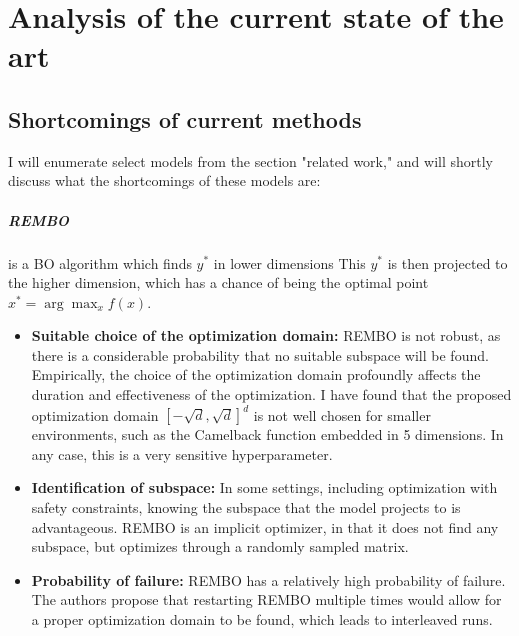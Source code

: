 \chapter{Analysis of the current state of the art}

\ifpdf
    \graphicspath{{Chapter3/Figs/Raster/}{Chapter3/Figs/PDF/}{Chapter3/Figs/}}
\else
    \graphicspath{{Chapter3/Figs/Vector/}{Chapter3/Figs/}}
\fi

\section{Shortcomings of current methods}
I will enumerate select models from the section "related work," and will shortly discuss what the shortcomings of these models are:

\paragraph{REMBO} is a BO algorithm which finds $y^*$ in lower dimensions This $y^*$ is then projected to the higher dimension, which has a chance of being the optimal point $x^* = \arg \max_{x} f(x)$. 

\begin{itemize}

\item \textbf{Suitable choice of the optimization domain:} REMBO is not robust, as there is a considerable probability that no suitable subspace will be found. 
Empirically, the choice of the optimization domain profoundly affects the duration and effectiveness of the optimization.
I have found that the proposed optimization domain $ \left[ -\sqrt{d}, \sqrt{d}  \right]^d $ is not well chosen for smaller environments, such as the Camelback function embedded in 5 dimensions.
In any case, this is a very sensitive hyperparameter.

\item \textbf{Identification of subspace:} In some settings, including optimization with safety constraints, knowing the subspace that the model projects to is advantageous. 
REMBO is an implicit optimizer, in that it does not find any subspace, but optimizes through a randomly sampled matrix.

\item \textbf{Probability of failure:} REMBO has a relatively high probability of failure. 
The authors propose that restarting REMBO multiple times would allow for a proper optimization domain to be found, which leads to interleaved runs. 

\end{itemize}

